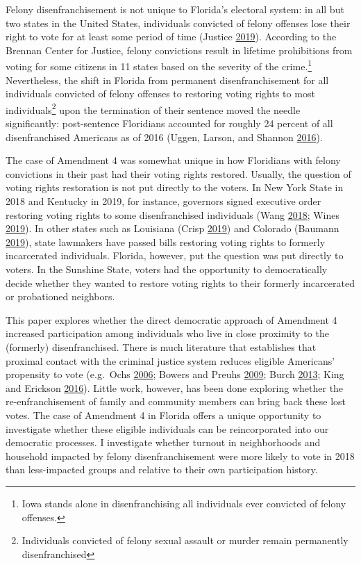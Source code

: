 \documentclass[
  12pt,
]{article}
\begin{document}
Felony disenfranchisement is not unique to Florida's electoral system: in all but two states in the United States, individuals convicted of felony offenses lose their right to vote for at least some period of time (Justice \protect\hyperlink{ref-bcj_laws}{2019}). According to the Brennan Center for Justice, felony convictions result in lifetime prohibitions from voting for some citizens in 11 states based on the severity of the crime.\footnote{Iowa stands alone in disenfranchising all individuals ever convicted of felony offenses.} Nevertheless, the shift in Florida from permanent disenfranchisement for all individuals convicted of felony offenses to restoring voting rights to most individuals\footnote{Individuals convicted of felony sexual assault or murder remain permanently disenfranchised} upon the termination of their sentence moved the needle significantly: post-sentence Floridians accounted for roughly 24 percent of all disenfranchised Americans as of 2016 (Uggen, Larson, and Shannon \protect\hyperlink{ref-sentencing_2016}{2016}).

The case of Amendment 4 was somewhat unique in how Floridians with felony convictions in their past had their voting rights restored. Usually, the question of voting rights restoration is not put directly to the voters. In New York State in 2018 and Kentucky in 2019, for instance, governors signed executive order restoring voting rights to some disenfranchised individuals (Wang \protect\hyperlink{ref-Wang2018}{2018}; Wines \protect\hyperlink{ref-Wines2019}{2019}). In other states such as Louisiana (Crisp \protect\hyperlink{ref-Crisp2019}{2019}) and Colorado (Baumann \protect\hyperlink{ref-Baumann2019}{2019}), state lawmakers have passed bills restoring voting rights to formerly incarcerated individuals. Florida, however, put the question was put directly to voters. In the Sunshine State, voters had the opportunity to democratically decide whether they wanted to restore voting rights to their formerly incarcerated or probationed neighbors.

This paper explores whether the direct democratic approach of Amendment 4 increased participation among individuals who live in close proximity to the (formerly) disenfranchised. There is much literature that establishes that proximal contact with the criminal justice system reduces eligible Americans' propensity to vote (e.g.~Ochs \protect\hyperlink{ref-Ochs2006}{2006}; Bowers and Preuhs \protect\hyperlink{ref-Bowers2009}{2009}; Burch \protect\hyperlink{ref-Burch2013}{2013}; King and Erickson \protect\hyperlink{ref-King2016}{2016}). Little work, however, has been done exploring whether the re-enfranchisement of family and community members can bring back these lost votes. The case of Amendment 4 in Florida offers a unique opportunity to investigate whether these eligible individuals can be reincorporated into our democratic processes. I investigate whether turnout in neighborhoods and household impacted by felony disenfranchisement were more likely to vote in 2018 than less-impacted groups and relative to their own participation history.
\end{document}
